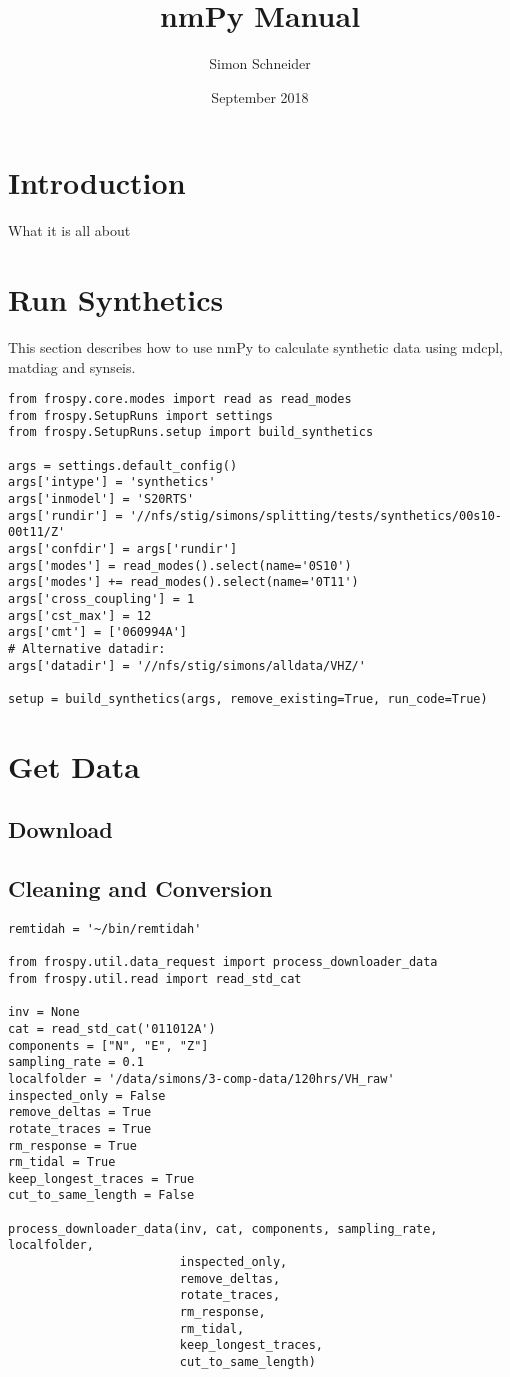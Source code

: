 \documentclass{article}
\title{nmPy Manual}
\author{Simon Schneider}
\date{September 2018}
\begin{document}
\maketitle
\tableofcontents
\section{Introduction}
What it is all about
\section{Run Synthetics}
This section describes how to use nmPy to calculate synthetic data using mdcpl,
 matdiag and synseis.
\begin{lstlisting}
from frospy.core.modes import read as read_modes
from frospy.SetupRuns import settings
from frospy.SetupRuns.setup import build_synthetics

args = settings.default_config()
args['intype'] = 'synthetics'
args['inmodel'] = 'S20RTS'
args['rundir'] = '//nfs/stig/simons/splitting/tests/synthetics/00s10-00t11/Z'
args['confdir'] = args['rundir']
args['modes'] = read_modes().select(name='0S10')
args['modes'] += read_modes().select(name='0T11')
args['cross_coupling'] = 1
args['cst_max'] = 12
args['cmt'] = ['060994A']
# Alternative datadir:
args['datadir'] = '//nfs/stig/simons/alldata/VHZ/'

setup = build_synthetics(args, remove_existing=True, run_code=True)
\end{lstlisting}

\section{Get Data}
\subsection{Download}
\subsection{Cleaning and Conversion}
\begin{lstlisting}
remtidah = '~/bin/remtidah'

from frospy.util.data_request import process_downloader_data
from frospy.util.read import read_std_cat

inv = None
cat = read_std_cat('011012A')
components = ["N", "E", "Z"]
sampling_rate = 0.1
localfolder = '/data/simons/3-comp-data/120hrs/VH_raw'
inspected_only = False
remove_deltas = True
rotate_traces = True
rm_response = True
rm_tidal = True
keep_longest_traces = True
cut_to_same_length = False

process_downloader_data(inv, cat, components, sampling_rate, localfolder,
                        inspected_only,
                        remove_deltas,
                        rotate_traces,
                        rm_response,
                        rm_tidal,
                        keep_longest_traces,
                        cut_to_same_length)
\end{lstlisting}
\end{document}
